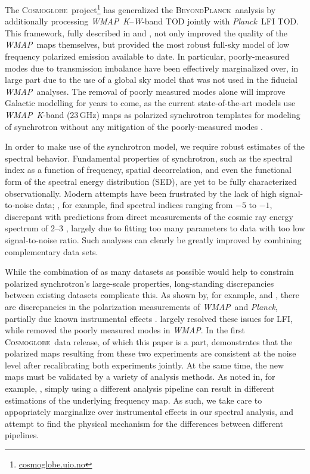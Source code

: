 \documentclass[twocolumn]{../../common/aa}
\def\WMAP{\emph{WMAP}}
\def\Planck{\emph{Planck}}
\newcommand{\bp}{\textsc{BeyondPlanck}}
\newcommand{\cosmoglobe}{\textsc{Cosmoglobe}}
\newcommand{\K}[0]{\textit K}
\newcommand{\W}[0]{\textit W}
\begin{document}
The \cosmoglobe\ project\footnote{\url{cosmoglobe.uio.no}} has generalized the \bp\ analysis by additionally processing \WMAP\ \K--\W-band TOD jointly with \Planck\ LFI TOD. This framework, fully described in \citet{bp17} and \cite{watts2023_dr1},
not only improved the quality of the \WMAP\ maps themselves, but provided the most robust full-sky model of low frequency polarized emission available to date. In particular, poorly-measured modes due to transmission imbalance \citep{jarosik2007} have been effectively marginalized over, in large part due to the use of a global sky model that was not used in the fiducial \WMAP\ analyses. The removal of poorly measured modes alone will improve Galactic modelling for years to come, as the current state-of-the-art models use \WMAP\ \K-band (23\,GHz) maps as polarized synchrotron templates for modeling of synchrotron without any mitigation of the poorly-measured modes \citep{delabrouille2012,pysm2,pysm3}.

In order to make use of the synchrotron model, we require robust estimates of the spectral behavior. Fundamental properties of synchrotron, such as the spectral index as a function of frequency, spatial decorrelation, and even the functional form of the spectral energy distribution (SED), are yet to be fully characterized observationally. Modern attempts have been frustrated by the lack of high signal-to-noise data; \citet{deBelsunce:2022}, for example, find spectral indices ranging from $-5$ to $-1$, discrepant with predictions from direct measurements of the cosmic ray energy spectrum of 2--3 \citep{rybicki,orlando2013,neronov2017}, largely due to fitting too many parameters to data with too low signal-to-noise ratio. Such analyses can clearly be greatly improved by combining complementary data sets.

While the combination of as many datasets as possible would help to constrain polarized synchrotron's large-scale properties, long-standing discrepancies between existing datasets complicate this. As shown by, for example, \citet{planck2014-a12} and \citet{weiland:2018}, there are discrepancies in the polarization measurements of \WMAP\ and \Planck, partially due known instrumental effects \citep{bennett2012,planck2016-l02}. \citet{bp01} largely resolved these issues for LFI, while \citet{bp17} removed the poorly measured modes in \WMAP. In the first \cosmoglobe\ data release, of which this paper is a part, \citet{watts2023_dr1} demonstrates that the polarized maps resulting from these two experiments are consistent at the noise level after recalibrating both experiments jointly. At the same time, the new maps must be validated by a variety of analysis methods. As noted in, for example, \citet{weiland:2022}, simply using a different analysis pipeline can result in different estimations of the underlying frequency map. As such, we take care to appopriately marginalize over instrumental effects in our spectral analysis, and attempt to find the physical mechanism for the differences between different pipelines.
\end{document}
